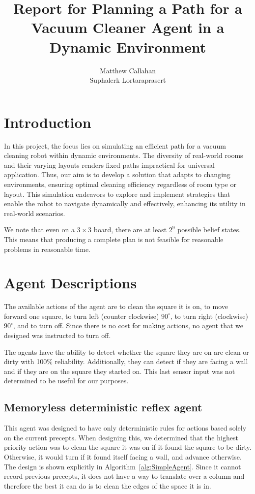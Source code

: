 \documentclass{article}
\title{Report for Planning a Path for a Vacuum Cleaner Agent in a Dynamic Environment}
\author{%
  Matthew Callahan\\
  \And
  Suphalerk Lortaraprasert
}
\begin{document}
\maketitle


\begin{abstract}

\end{abstract}

\section{Introduction}

In this project, the focus lies on simulating an efficient path for a vacuum cleaning robot within dynamic environments. The diversity of real-world rooms and their varying layouts renders fixed paths impractical for universal application. Thus, our aim is to develop a solution that adapts to changing environments, ensuring optimal cleaning efficiency regardless of room type or layout. This simulation endeavors to explore and implement strategies that enable the robot to navigate dynamically and effectively, enhancing its utility in real-world scenarios.

We note that even on a $3\times 3$ board, there are at least $2^9$ possible belief states. This means that producing a complete plan is not feasible for reasonable problems in reasonable time. 
\section{Agent Descriptions}
The available actions of the agent are to clean the square it is on, to move forward one square, to turn left (counter clockwise) $90^\circ$, to turn right (clockwise) $90^\circ$, and to turn off. Since there is no cost for making actions, no agent that we designed was instructed to turn off.

The agents have the ability to detect whether the square they are on are clean or dirty with 100\% reliability. Additionally, they can detect if they are facing a wall and if they are on the square they started on. This last sensor input was not determined to be useful for our purposes. 
\subsection{Memoryless deterministic reflex agent}
This agent was designed to have only deterministic rules for actions based solely on the current precepts. When designing this, we determined that the highest priority action was to clean the square it was on if it found the square to be dirty. Otherwise, it would turn if it found itself facing a wall, and advance otherwise. The design is shown explicitly in Algorithm~\ref{alg:SimpleAgent}. Since it cannot record previous precepts, it does not have a way to translate over a column and therefore the best it can do is to clean the edges of the space it is in.
\end{document}
